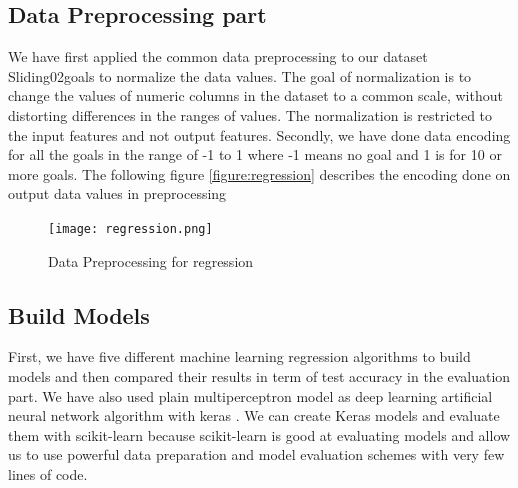 \subsection{Data Preprocessing part}
We have first applied the common data preprocessing to our dataset Sliding02goals to normalize the data values.\newline
The goal of normalization is to change the values of numeric columns in the dataset to a common scale, without distorting differences in the ranges of values. The normalization is restricted to the input features and not output features.\newline
Secondly, we have done data encoding for all the goals in the range of -1 to 1 where -1 means no goal and 1 is for 10 or more goals. 
The following figure \autoref{figure:regression} describes the encoding done on output data values in preprocessing
\begin{figure}[H]
\begin{center}
\texttt{[image: regression.png]}
\end{center}
\caption{Data Preprocessing for regression }
\label{figure:regression}
\end{figure}
\subsection{Build Models }
First, we have five different machine learning regression algorithms to build models and then compared their results in term of test accuracy in the evaluation part.\newline \newline
We have also used plain multiperceptron model as deep learning artificial neural network algorithm with keras . We can create Keras models and evaluate them with scikit-learn because scikit-learn is good at evaluating models and allow us to use powerful data preparation and model evaluation schemes with very few lines of code.
